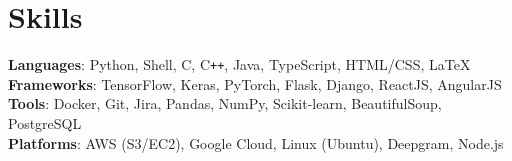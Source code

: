 \documentclass[letterpaper,11pt]{article}
\begin{document}
\section{Skills}
\begin{itemize}[leftmargin=0.15in, label={}]
  \small{\item{
        \textbf{Languages}{: Python, Shell, C, C\texttt{++}, Java, TypeScript, HTML/CSS, \LaTeX} \\
        \textbf{Frameworks}{: TensorFlow, Keras, PyTorch, Flask, Django, ReactJS, AngularJS} \\
        \textbf{Tools}{: Docker, Git, Jira, Pandas, NumPy, Scikit-learn, BeautifulSoup, PostgreSQL} \\
        \textbf{Platforms}{: AWS (S3/EC2), Google Cloud, Linux (Ubuntu), Deepgram, Node.js} \\
        }}
\end{itemize}
\end{document}
